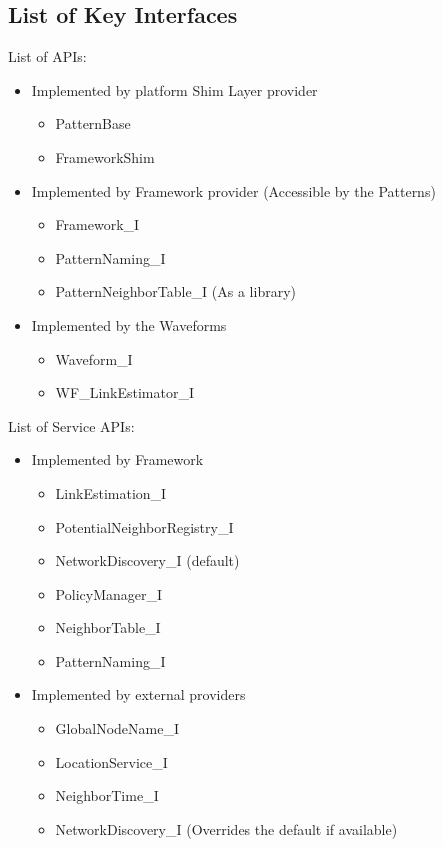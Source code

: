 \subsection{List of Key Interfaces}

List of APIs:
\begin{itemize}
 \item  Implemented by platform Shim Layer provider
    \begin{itemize}
      \item PatternBase
      \item FrameworkShim
    \end{itemize}
 \item Implemented by Framework provider (Accessible by the Patterns)
    \begin{itemize}
      \item Framework\_I
      \item PatternNaming\_I
      \item PatternNeighborTable\_I (As a library)
    \end{itemize}
 \item Implemented by the Waveforms
    \begin{itemize}
      \item Waveform\_I
      \item WF\_LinkEstimator\_I
    \end{itemize}
\end{itemize}


List of Service APIs:
\begin{itemize}
 \item Implemented by Framework
    \begin{itemize}
      \item LinkEstimation\_I
      \item PotentialNeighborRegistry\_I
      \item NetworkDiscovery\_I (default)
      \item PolicyManager\_I
      \item NeighborTable\_I
      \item PatternNaming\_I
    \end{itemize}
 \item Implemented by external providers
    \begin{itemize}
      \item GlobalNodeName\_I
      \item LocationService\_I
      \item NeighborTime\_I
      \item NetworkDiscovery\_I (Overrides the default if available)
   \end{itemize}
\end{itemize}